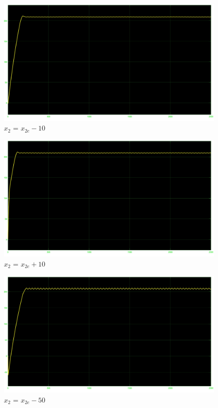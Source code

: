 \documentclass[a4paper, 11pt]{article}
\begin{document}
\begin{figure}[!h]
    \centering
    \includegraphics[scale=0.2]{punto_2/NoLin_x2e-10.jpg}
    \caption{$x_2$ = $x_{2e} - 10$}
    \label{fig:enter-label}
\end{figure}

\begin{figure}[!h]
    \centering
    \includegraphics[scale=0.2]{punto_2/NoLin_x2e+10.jpg}
    \caption{$x_2$ = $x_{2e} + 10$}
    \label{fig:enter-label}
\end{figure}

\begin{figure}[!h]
    \centering
    \includegraphics[scale=0.2]{punto_2/NoLin_x2e-50.jpg}
    \caption{$x_2$ = $x_{2e} - 50$}
    \label{fig:enter-label}
\end{figure}
\end{document}
